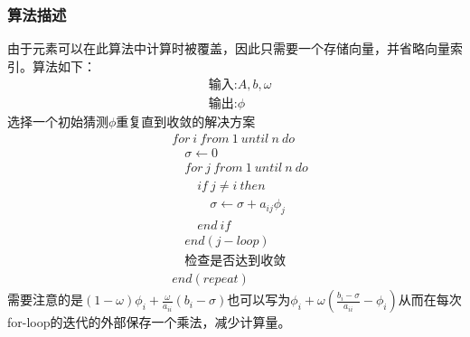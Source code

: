 \documentclass[twoside,twocolumn]{article}
\begin{document}
\begin{CJK*}{UTF8}{gkai}
	\subsubsection{算法描述}
	由于元素可以在此算法中计算时被覆盖，因此只需要一个存储向量，并省略向量索引。算法如下：
	\begin{equation*}
	\begin{aligned}
	&\text{输入:}A,b,\omega\\
	&\text{输出:}\phi
	\end{aligned}
	\end{equation*}
	选择一个初始猜测$\phi$重复直到收敛的解决方案
	\begin{equation*}
	\begin{aligned}
	&for~i~from~1~until~n~do\\
	&\quad \sigma\leftarrow 0\\
	&\quad for~j~from~1~until~n~do\\
	&\qquad if~j\neq i~then\\
	&\qquad \quad \sigma \leftarrow \sigma+a_{ij}\phi_{j}\\
	&\qquad end~if\\
	&\quad end(j-loop)\\
	&\quad \text{检查是否达到收敛}\\
	&end (repeat)
	\end{aligned}
	\end{equation*}
	需要注意的是$ (1-\omega )\phi _{i}+{\frac {\omega }{a_{ii}}}(b_{i}-\sigma )$也可以写为$\phi _{i}+\omega \left({\frac {b_{i}-\sigma }{a_{ii}}}-\phi _{i}\right)$从而在每次for-loop的迭代的外部保存一个乘法，减少计算量。

\end{CJK*}
\end{document}
